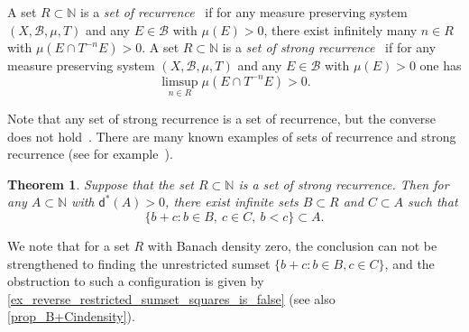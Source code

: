 \documentclass[10pt,dvipsnames]{article}
\newtheorem{theorem}{Theorem}[section]
\theoremstyle{definition}
\theoremstyle{plain}
\newcommand{\define}[1]{\textit{#1}}
\newcommand{\N}{\mathbb{N}}
\newcommand{\ubdens}{\mathsf{d}^*}
\begin{document}
A set $R\subset\N$ is a \define{set of recurrence}~\cite{Furstenberg-book} if for any measure preserving system $(X,\mathcal{B},\mu,T)$ and any $E\in \mathcal{B}$ with $\mu(E)>0$, there exist infinitely many $n\in R$ with $\mu(E\cap T^{-n}E)>0$.
A set $R\subset\N$ is a \define{set of strong recurrence}~\cite{bergelson} if for any measure preserving system $(X,\mathcal{B},\mu,T)$ and any $E\in \mathcal{B}$ with $\mu(E)>0$ one has
\[
\limsup_{n\in R} \mu(E\cap T^{-n}E)>0.
\]

Note that any set of strong recurrence is a set of recurrence, but the converse does not hold~\cite{forrest-1991}. There are many known examples of sets of  recurrence and strong recurrence (see for example~\cite{Furstenberg-BAMS}).
 


\begin{theorem}
\label{thm_sumset_recurrence}
Suppose that the set $R\subset\N$ is a set of strong recurrence. Then for any $A\subset\N$ with $\ubdens(A)>0$, there exist  infinite sets $B\subset R$ and $C\subset A$ such that
\[
\{b+c: b\in B,~c\in C,~b<c\}\subset A.
\]
\end{theorem}

We note that for a set $R$ with Banach density zero, the conclusion can not be strengthened to finding the unrestricted sumset $\{b+c:b\in B, c\in C\}$, 
and the obstruction to such a configuration is given by \cref{ex_reverse_restricted_sumset_squares_is_false} (see also \cref{prop_B+Cindensity}). 
\end{document}
